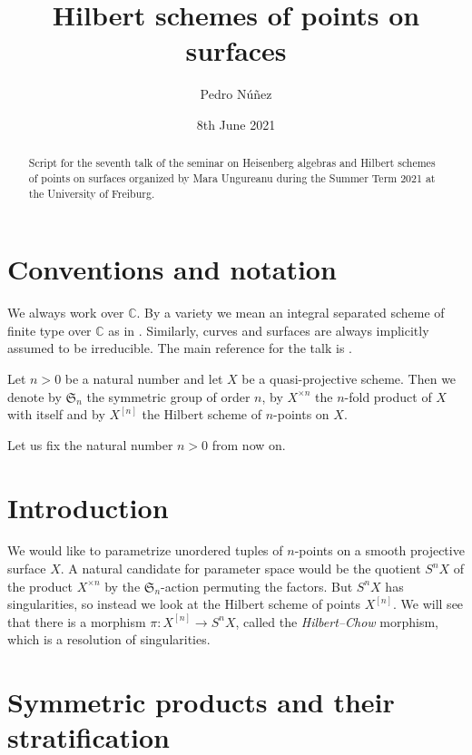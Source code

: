 \documentclass[12pt,a4paper]{amsart}
\title[Hilbert schemes of points on surfaces]{Hilbert schemes of points on surfaces}
\author[Pedro N\'{u}\~{n}ez]{Pedro N\'{u}\~{n}ez}
\date{8th June 2021}
\theoremstyle{plain}
\theoremstyle{definition}
\theoremstyle{remark}
\begin{document}
\maketitle

\begin{abstract}
  Script for the seventh talk of the seminar on Heisenberg algebras and Hilbert schemes of points on surfaces organized by Mara Ungureanu during the Summer Term 2021 at the University of Freiburg.
\end{abstract}

\tableofcontents

\setcounter{section}{-1}

\section{Conventions and notation}

We always work over $\mathbb{C}$.
By a variety we mean an integral separated scheme of finite type over $\mathbb{C}$ as in \cite{har77}.
Similarly, curves and surfaces are always implicitly assumed to be irreducible.
The main reference for the talk is \cite[\S 1]{nak99}.

Let $n > 0$ be a natural number and let $X$ be a quasi-projective scheme.
Then we denote by $\mathfrak{S}_{n}$ the symmetric group of order $n$, by $X^{\times n}$ the $n$-fold product of $X$ with itself and by $X^{[n]}$ the Hilbert scheme of $n$-points on $X$.

Let us fix the natural number $n > 0$ from now on.

\section{Introduction}

We would like to parametrize unordered tuples of $n$-points on a smooth projective surface $X$.
A natural candidate for parameter space would be the quotient $S^{n}X$ of the product $X^{\times n}$ by the $\mathfrak{S}_{n}$-action permuting the factors.
But $S^{n}X$ has singularities, so instead we look at the Hilbert scheme of points $X^{[n]}$.
We will see that there is a morphism $\pi \colon X^{[n]} \to S^{n}X$, called the \textit{Hilbert--Chow} morphism, which is a resolution of singularities.

\section{Symmetric products and their stratification}
\end{document}
